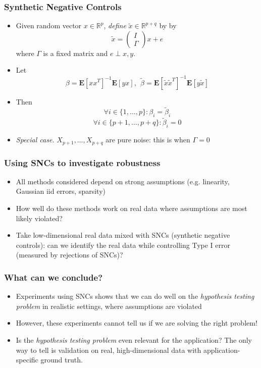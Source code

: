 \documentclass{beamer}
\newcommand{\E}{\textbf{E}}
\begin{document}
\begin{frame}
\frametitle{Synthetic Negative Controls}
\begin{itemize}
\item<1-> Given random vector $x \in \mathbb{R}^p$, \emph{define} $\tilde{x} \in \mathbb{R}^{p+q}$ by
by
\[
\tilde{x} = \begin{pmatrix}I \\ \Gamma\end{pmatrix} x + e
\]
where $\Gamma$ is a fixed matrix and $e \perp x, y$.
\item<2-> Let
\[
\beta = \E[xx^T]^{-1}\E[yx], \ \ \tilde{\beta} = \E[\tilde{x}\tilde{x}^T]^{-1} \E[y\tilde{x}]
\]
\item<3-> Then
\[
\forall i \in \{1, \hdots, p\}: \beta_i = \tilde{\beta}_i
\]
\[
\forall i \in \{p+1,\hdots, p+q\}: \tilde{\beta}_i = 0
\]
\item<4->
\emph{Special case.} $X_{p+1},\hdots, X_{p+q}$ are pure noise: this is when $\Gamma = 0$
\end{itemize}
\end{frame}

\begin{frame}
\frametitle{Using SNCs to investigate robustness}
\begin{itemize}
\item<1-> All methods considered depend on strong assumptions (e.g. linearity, Gaussian iid errors, sparsity)
\item<1-> How well do these methods work on real data where assumptions are most likely violated?
\item<2-> Take low-dimensional real data mixed with SNCs (synthetic negative controls): can we identify the real data while controlling Type I error (measured by rejections of SNCs)?
\end{itemize}
\end{frame}

\begin{frame}
\frametitle{What can we conclude?}
\begin{itemize}
\item Experiments using SNCs shows that we can do well on the
  \emph{hypothesis testing problem} in realistic settings, where
  assumptions are violated
\item However, these experiments cannot tell us if we are solving the right problem!
\item Is the \emph{hypothesis testing problem} even relevant
  for the application? The only way to tell is validation on real,
  high-dimensional data with application-specific ground truth.
\end{itemize}
\end{frame}
\end{document}
